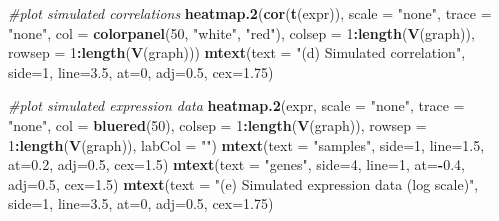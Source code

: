 \documentclass[]{article}
\newenvironment{Shaded}{\begin{snugshade}}{\end{snugshade}}
\newcommand{\CommentTok}[1]{\textcolor[rgb]{0.56,0.35,0.01}{\textit{#1}}}
\newcommand{\DataTypeTok}[1]{\textcolor[rgb]{0.13,0.29,0.53}{#1}}
\newcommand{\DecValTok}[1]{\textcolor[rgb]{0.00,0.00,0.81}{#1}}
\newcommand{\FloatTok}[1]{\textcolor[rgb]{0.00,0.00,0.81}{#1}}
\newcommand{\KeywordTok}[1]{\textcolor[rgb]{0.13,0.29,0.53}{\textbf{#1}}}
\newcommand{\NormalTok}[1]{#1}
\newcommand{\OperatorTok}[1]{\textcolor[rgb]{0.81,0.36,0.00}{\textbf{#1}}}
\newcommand{\StringTok}[1]{\textcolor[rgb]{0.31,0.60,0.02}{#1}}
\begin{document}
\begin{Shaded}
\begin{Highlighting}[]
\CommentTok{#plot simulated correlations}
\KeywordTok{heatmap.2}\NormalTok{(}\KeywordTok{cor}\NormalTok{(}\KeywordTok{t}\NormalTok{(expr)), }\DataTypeTok{scale =} \StringTok{"none"}\NormalTok{, }\DataTypeTok{trace =} \StringTok{"none"}\NormalTok{, }\DataTypeTok{col =} \KeywordTok{colorpanel}\NormalTok{(}\DecValTok{50}\NormalTok{, }\StringTok{"white"}\NormalTok{, }\StringTok{"red"}\NormalTok{),}
\DataTypeTok{colsep =} \DecValTok{1}\OperatorTok{:}\KeywordTok{length}\NormalTok{(}\KeywordTok{V}\NormalTok{(graph)), }\DataTypeTok{rowsep =} \DecValTok{1}\OperatorTok{:}\KeywordTok{length}\NormalTok{(}\KeywordTok{V}\NormalTok{(graph)))}
\KeywordTok{mtext}\NormalTok{(}\DataTypeTok{text =} \StringTok{"(d) Simulated correlation"}\NormalTok{, }\DataTypeTok{side=}\DecValTok{1}\NormalTok{, }\DataTypeTok{line=}\FloatTok{3.5}\NormalTok{, }\DataTypeTok{at=}\DecValTok{0}\NormalTok{, }\DataTypeTok{adj=}\FloatTok{0.5}\NormalTok{, }\DataTypeTok{cex=}\FloatTok{1.75}\NormalTok{)}

\CommentTok{#plot simulated expression data}
\KeywordTok{heatmap.2}\NormalTok{(expr, }\DataTypeTok{scale =} \StringTok{"none"}\NormalTok{, }\DataTypeTok{trace =} \StringTok{"none"}\NormalTok{, }\DataTypeTok{col =} \KeywordTok{bluered}\NormalTok{(}\DecValTok{50}\NormalTok{),}
\DataTypeTok{colsep =} \DecValTok{1}\OperatorTok{:}\KeywordTok{length}\NormalTok{(}\KeywordTok{V}\NormalTok{(graph)), }\DataTypeTok{rowsep =} \DecValTok{1}\OperatorTok{:}\KeywordTok{length}\NormalTok{(}\KeywordTok{V}\NormalTok{(graph)), }\DataTypeTok{labCol =} \StringTok{""}\NormalTok{)}
\KeywordTok{mtext}\NormalTok{(}\DataTypeTok{text =} \StringTok{"samples"}\NormalTok{, }\DataTypeTok{side=}\DecValTok{1}\NormalTok{, }\DataTypeTok{line=}\FloatTok{1.5}\NormalTok{, }\DataTypeTok{at=}\FloatTok{0.2}\NormalTok{, }\DataTypeTok{adj=}\FloatTok{0.5}\NormalTok{, }\DataTypeTok{cex=}\FloatTok{1.5}\NormalTok{)}
\KeywordTok{mtext}\NormalTok{(}\DataTypeTok{text =} \StringTok{"genes"}\NormalTok{, }\DataTypeTok{side=}\DecValTok{4}\NormalTok{, }\DataTypeTok{line=}\DecValTok{1}\NormalTok{, }\DataTypeTok{at=}\OperatorTok{-}\FloatTok{0.4}\NormalTok{, }\DataTypeTok{adj=}\FloatTok{0.5}\NormalTok{, }\DataTypeTok{cex=}\FloatTok{1.5}\NormalTok{)}
\KeywordTok{mtext}\NormalTok{(}\DataTypeTok{text =} \StringTok{"(e) Simulated expression data (log scale)"}\NormalTok{, }\DataTypeTok{side=}\DecValTok{1}\NormalTok{, }\DataTypeTok{line=}\FloatTok{3.5}\NormalTok{, }\DataTypeTok{at=}\DecValTok{0}\NormalTok{, }\DataTypeTok{adj=}\FloatTok{0.5}\NormalTok{, }\DataTypeTok{cex=}\FloatTok{1.75}\NormalTok{)}
\end{Highlighting}
\end{Shaded}
\end{document}
